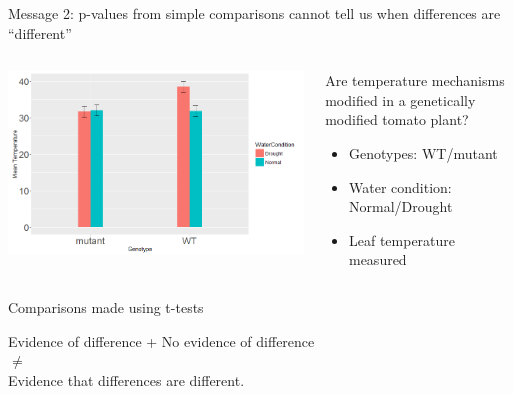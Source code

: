 \documentclass[10pt]{beamer}
\begin{document}
\begin{frame}{Message 2: p-values from simple comparisons cannot tell us when differences are “different”}
 \pause
  \begin{columns}
    \begin{column}{0.5\textwidth}
	\begin{center}
	\includegraphics[width=\textwidth]{Figures/message2}
	\end{center}
    \end{column}
    
    \begin{column}{0.5\textwidth}
    \begin{block}{Are temperature mechanisms modified in a genetically modified tomato plant?}
      \begin{itemize}
	\item Genotypes: WT/mutant 
	\item Water condition: Normal/Drought
	\item Leaf temperature measured
      \end{itemize}
      \end{block}
  
    \end{column}
  \end{columns}
   
   
   \begin{alertblock}{Comparisons made using t-tests}
   
    \begin{center}
        Evidence of difference + No evidence of difference \\ $\neq$ \\ Evidence that differences are different.
    \end{center}

  \end{alertblock}
      
\end{frame}
\end{document}
